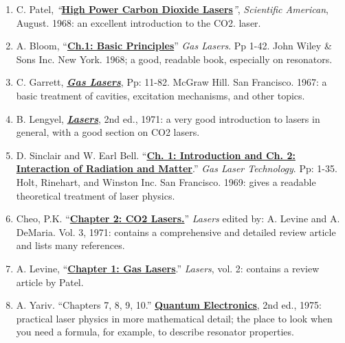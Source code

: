 \documentclass{../lab}
\begin{document}
\begin{enumerate}
    \item C. Patel, \emph{``}\href{http://physics111.lib.berkeley.edu/Physics111/Reprints/CO2/01-High\_Power\_Carbon\_Dioxide\_Lasers.pdf}{\textbf{High Power Carbon Dioxide Lasers}}\emph{''}, \emph{Scientific American}, August. 1968: an excellent introduction to the CO2. laser.
    \item A. Bloom, ``\href{http://physics111.lib.berkeley.edu/Physics111/Reprints/CO2/CO2\_ch1\_A\_Bloom\_Basic\%20Principles.pdf}{\textbf{Ch.1: Basic Principles}}'' \emph{Gas Lasers}. Pp 1-42. John Wiley \& Sons Inc. New York. 1968; a good, readable book, especially on resonators.
    \item C. Garrett, \emph{\href{http://physics111.lib.berkeley.edu/Physics111/Reprints/CO2/CO2\%20OCR\%20Gas\%20Lasers\%20Garrett\%20pg.\%2011-82.pdf}{\textbf{Gas Lasers}}}, Pp: 11-82. McGraw Hill. San Francisco. 1967: a basic treatment of cavities, excitation mechanisms, and other topics.
    \item B. Lengyel, \emph{\href{http://physics111.lib.berkeley.edu/Physics111/Reprints/CO2/02-Gas\_Lasers.pdf}{\textbf{Lasers}}}, 2nd ed., 1971: a very good introduction to lasers in general, with a good section on CO2 lasers.
    \item D. Sinclair and W. Earl Bell. ``\href{http://physics111.lib.berkeley.edu/Physics111/Reprints/CO2/CO2\%20\%20OCR\%20ch1\%20and\%202\_Sinclair\_Bell.pdf}{\textbf{Ch. 1: Introduction and Ch. 2: Interaction of Radiation and Matter}}.'' \emph{Gas Laser Technology}. Pp: 1-35. Holt, Rinehart, and Winston Inc. San Francisco. 1969: gives a readable theoretical treatment of laser physics.
    \item Cheo, P.K. ``\href{http://physics111.lib.berkeley.edu/Physics111/Reprints/CO2/03-CO2\_Lasers.pdf}{\textbf{Chapter 2: CO2 Lasers.}}'' \emph{Lasers} edited by: A. Levine and A. DeMaria. Vol. 3, 1971: contains a comprehensive and detailed review article and lists many references.
    \item A. Levine, ``\href{http://physics111.lib.berkeley.edu/Physics111/Reprints/Lasers\%20Vol\%202\%20Levine/Chapter\%201\%20Gas\%20lasers\%20CKN\%20Patel.pdf}{\textbf{Chapter 1: Gas Lasers}}.'' \emph{Lasers}, vol. 2: contains a review article by Patel.
    \item A. Yariv. ``Chapters 7, 8, 9, 10.'' \href{http://physics111.lib.berkeley.edu/Physics111/Reprints/CO2/Quantum\_Electronics2ed\_A-Yariv/CO2\_Quantum\%20Electronics\_index.html}{\textbf{Quantum Electronics}}, 2nd ed., 1975: practical laser physics in more mathematical detail; the place to look when you need a formula, for example, to describe resonator properties.

\end{enumerate}
\end{document}
